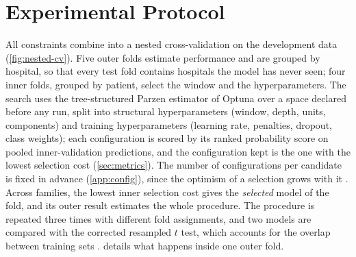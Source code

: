\documentclass[11pt,a4paper,oneside]{report}
\begin{document}
\section{Experimental Protocol}\label{sec:evaluation}\label{sec:training}\label{sec:cv-structure}\label{sec:repeats}

All constraints combine into a nested cross-validation on the development data (\cref{fig:nested-cv}). Five outer folds estimate performance and are grouped by hospital, so that every test fold contains hospitals the model has never seen; four inner folds, grouped by patient, select the window and the hyperparameters. The search uses the tree-structured Parzen estimator of Optuna \parencite{bergstra2011,akiba2019} over a space declared before any run, split into structural hyperparameters (window, depth, units, components) and training hyperparameters (learning rate, penalties, dropout, class weights); each configuration is scored by its ranked probability score on pooled inner-validation predictions, and the configuration kept is the one with the lowest selection cost (\cref{sec:metrics}). The number of configurations per candidate is fixed in advance (\cref{app:config}), since the optimism of a selection grows with it \parencite{cawley2010}. Across families, the lowest inner selection cost gives the \emph{selected} model of the fold, and its outer result estimates the whole procedure. The procedure is repeated three times with different fold assignments, and two models are compared with the corrected resampled $t$ test, which accounts for the overlap between training sets \parencite{nadeau2003}.  details what happens inside one outer fold.
\end{document}

